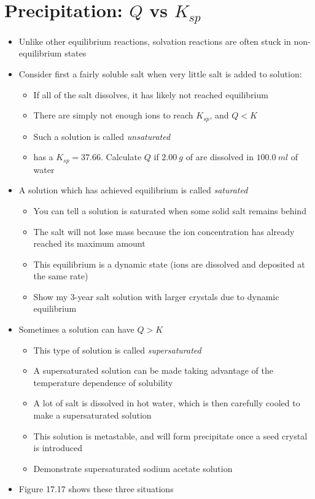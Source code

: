 \documentclass[12pt, openany, letterpaper]{memoir}
\begin{document}
\section{Precipitation: $Q$ vs $K_{sp}$}
\begin{itemize}
	\item Unlike other equilibrium reactions, solvation reactions are often stuck in non-equilibrium states
	\item Consider first a fairly soluble salt when very little salt is added to solution:
	\begin{itemize}
		\item If all of the salt dissolves, it has likely not reached equilibrium
		\item There are simply not enough ions to reach $K_{sp}$, and $Q<K$
		\item Such a solution is called \emph{unsaturated}
		\item {} has a $K_{sp} = 37.66$. Calculate $Q$ if $2.00~g$ of  are dissolved in $100.0~ml$ of water
	\end{itemize}
	\item A solution which has achieved equilibrium is called \emph{saturated}
	\begin{itemize}
		\item You can tell a solution is saturated when some solid salt remains behind
		\item The salt will not lose mass because the ion concentration has already reached its maximum amount
		\item This equilibrium is a dynamic state (ions are dissolved and deposited at the same rate)
		\item Show my 3-year salt solution with larger crystals due to dynamic equilibrium
	\end{itemize}
	\item Sometimes a solution can have $Q>K$
	\begin{itemize}
		\item This type of solution is called \emph{supersaturated}
		\item A supersaturated solution can be made taking advantage of the temperature dependence of solubility
		\item A lot of salt is dissolved in hot water, which is then carefully cooled to make a supersaturated solution
		\item This solution is metastable, and will form precipitate once a seed crystal is introduced
		\item Demonstrate supersaturated sodium acetate solution
	\end{itemize}
	\item Figure 17.17 shows these three situations
\end{itemize}
\end{document}
